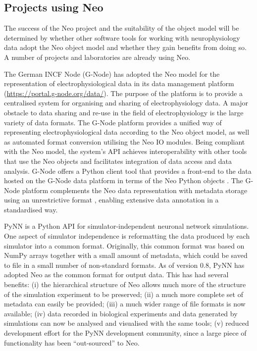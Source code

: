 \documentclass{frontiers}
\begin{document}
\subsection{Projects using Neo}

The success of the Neo project and the suitability of the object model will be determined by whether other software tools for working with neurophysiology data adopt the Neo object model and whether they gain benefits from doing so. A number of projects and laboratories are already using Neo.

The German INCF Node (G-Node) has adopted the Neo model for the representation of electrophysiological data in its data management platform (\url{https://portal.g-node.org/data/}).
The purpose of the platform is to provide a centralised system for organising and sharing of electrophysiology data.
A major obstacle to data sharing and re-use in the field of electrophysiology is the large variety of data formats.
The G-Node platform provides a unified way of representing electrophysiological data according to the Neo object model, as well as automated format conversion utilising the Neo IO modules.
Being compliant with the Neo model, the system's API achieves interoperability with other tools that use the Neo objects and facilitates integration of data access and data analysis.
G-Node offers a Python client tool that provides a front-end to the data hosted on the G-Node data platform in terms of the Neo Python objects \citep{Sobolev2014}.
The G-Node platform complements the Neo data representation with metadata storage using an unrestrictive format \citep{Grewe2011}, enabling extensive data annotation in a standardised way.

PyNN \citep{Davison2009} is a Python API for simulator-independent neuronal network simulations.
One aspect of simulator independence is reformatting the data produced by each simulator into a common format.
Originally, this common format was based on NumPy arrays together with a small amount of metadata, which could be saved to file in a small number of non-standard formats.
As of version 0.8, PyNN has adopted Neo as the common format for output data.
This has had several benefits:
  (i)   the hierarchical structure of Neo allows much more of the structure of the simulation experiment to be preserved;
  (ii)  a much more complete set of metadata can easily be provided;
  (iii) a much wider range of file formats is now available;
  (iv)  data recorded in biological experiments and data generated by simulations can now be analysed and visualised with the same tools; 
  (v)   reduced development effort for the PyNN development community, since a large piece of functionality has been ``out-sourced'' to Neo.
\end{document}
